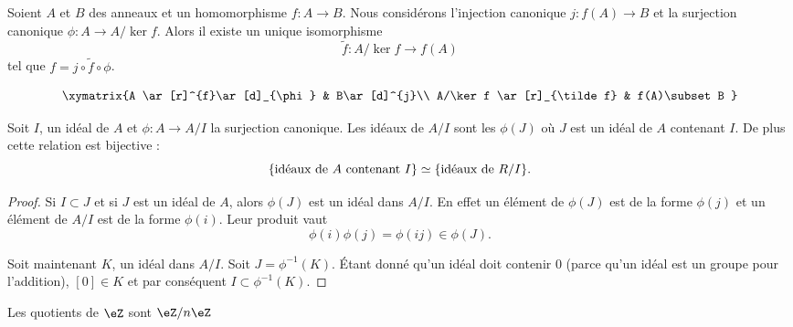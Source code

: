 \begin{proposition}
    Soient \( A\) et \( B\) des anneaux et un homomorphisme \( f\colon A\to B\). Nous considérons l'injection canonique \( j\colon f(A)\to B\) et la surjection canonique \( \phi\colon A\to A/\ker f\). Alors il existe un unique isomorphisme
    \begin{equation}
        \tilde f \colon A/\ker f\to f(A)
    \end{equation}
    tel que \( f=j\circ\tilde f\circ\phi\).

    \begin{equation}
        \xymatrix{%
        A \ar[r]^{f}\ar[d]_{\phi}        &   B\ar[d]^{j}\\
           A/\ker f \ar[r]_{\tilde f}   &   f(A)\subset B
           }
    \end{equation}
\end{proposition}

\begin{proposition}     \label{PropIJJIdsousphi}
    Soit \( I\), un idéal de \( A\) et \( \phi\colon A\to A/I\) la surjection canonique. Les idéaux de \( A/I\) sont les \( \phi(J)\) où \( J\) est un idéal de \( A\) contenant \( I\). De plus cette relation est bijective :
    \begin{equation}        \label{EqKbrizu}
        \{ \text{idéaux de \( A\) contenant \( I\)}\}\simeq\{ \text{idéaux de \( R/I\)} \}.
    \end{equation}
\end{proposition}

\begin{proof}
    Si \( I\subset J\) et si \( J \) est un idéal de \( A\), alors \( \phi(J)\) est un idéal dans \( A/I\). En effet un élément de \( \phi(J)\) est de la forme \( \phi(j)\) et un élément de \( A/I\) est de la forme \( \phi(i)\). Leur produit vaut
    \begin{equation}
        \phi(i)\phi(j)=\phi(ij)\in\phi(J).
    \end{equation}
    
    Soit maintenant \( K\), un idéal dans \( A/I\). Soit \( J=\phi^{-1}(K)\). Étant donné qu'un idéal doit contenir \( 0\) (parce qu'un idéal est un groupe pour l'addition), \( [0]\in K\) et par conséquent \( I\subset\phi^{-1}(K)\).
\end{proof}

\begin{corollary}
    Les quotients de \( \eZ\) sont \( \eZ/n\eZ\)
\end{corollary}


